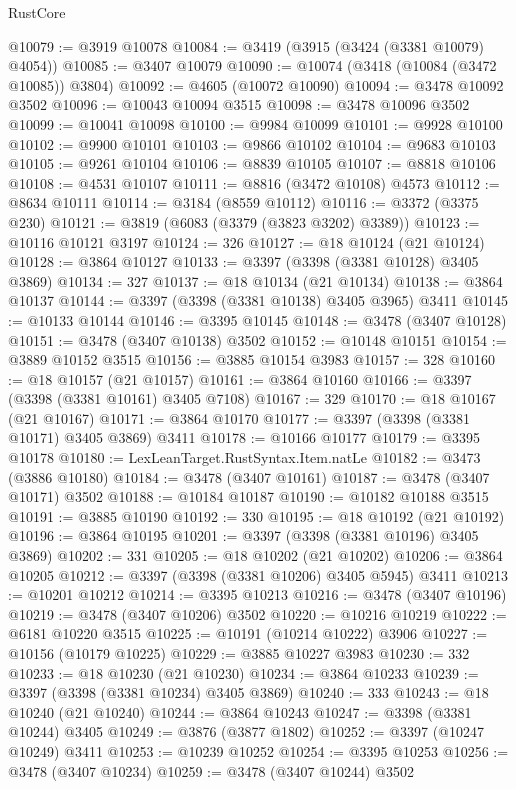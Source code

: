 \begin{lexlean}{RustCore}
\begin{coremodule}
@10079 := @3919 @10078
@10084 := @3419 (@3915 (@3424 (@3381 @10079) @4054))
@10085 := @3407 @10079
@10090 := @10074 (@3418 (@10084 (@3472 @10085)) @3804)
@10092 := @4605 (@10072 @10090)
@10094 := @3478 @10092 @3502
@10096 := @10043 @10094 @3515
@10098 := @3478 @10096 @3502
@10099 := @10041 @10098
@10100 := @9984 @10099
@10101 := @9928 @10100
@10102 := @9900 @10101
@10103 := @9866 @10102
@10104 := @9683 @10103
@10105 := @9261 @10104
@10106 := @8839 @10105
@10107 := @8818 @10106
@10108 := @4531 @10107
@10111 := @8816 (@3472 @10108) @4573
@10112 := @8634 @10111
@10114 := @3184 (@8559 @10112)
@10116 := @3372 (@3375 @230)
@10121 := @3819 (@6083 (@3379 (@3823 @3202) @3389))
@10123 := @10116 @10121 @3197
@10124 := 326
@10127 := @18 @10124 (@21 @10124)
@10128 := @3864 @10127
@10133 := @3397 (@3398 (@3381 @10128) @3405 @3869)
@10134 := 327
@10137 := @18 @10134 (@21 @10134)
@10138 := @3864 @10137
@10144 := @3397 (@3398 (@3381 @10138) @3405 @3965) @3411
@10145 := @10133 @10144
@10146 := @3395 @10145
@10148 := @3478 (@3407 @10128)
@10151 := @3478 (@3407 @10138) @3502
@10152 := @10148 @10151
@10154 := @3889 @10152 @3515
@10156 := @3885 @10154 @3983
@10157 := 328
@10160 := @18 @10157 (@21 @10157)
@10161 := @3864 @10160
@10166 := @3397 (@3398 (@3381 @10161) @3405 @7108)
@10167 := 329
@10170 := @18 @10167 (@21 @10167)
@10171 := @3864 @10170
@10177 := @3397 (@3398 (@3381 @10171) @3405 @3869) @3411
@10178 := @10166 @10177
@10179 := @3395 @10178
@10180 := LexLeanTarget.RustSyntax.Item.natLe
@10182 := @3473 (@3886 @10180)
@10184 := @3478 (@3407 @10161)
@10187 := @3478 (@3407 @10171) @3502
@10188 := @10184 @10187
@10190 := @10182 @10188 @3515
@10191 := @3885 @10190
@10192 := 330
@10195 := @18 @10192 (@21 @10192)
@10196 := @3864 @10195
@10201 := @3397 (@3398 (@3381 @10196) @3405 @3869)
@10202 := 331
@10205 := @18 @10202 (@21 @10202)
@10206 := @3864 @10205
@10212 := @3397 (@3398 (@3381 @10206) @3405 @5945) @3411
@10213 := @10201 @10212
@10214 := @3395 @10213
@10216 := @3478 (@3407 @10196)
@10219 := @3478 (@3407 @10206) @3502
@10220 := @10216 @10219
@10222 := @6181 @10220 @3515
@10225 := @10191 (@10214 @10222) @3906
@10227 := @10156 (@10179 @10225)
@10229 := @3885 @10227 @3983
@10230 := 332
@10233 := @18 @10230 (@21 @10230)
@10234 := @3864 @10233
@10239 := @3397 (@3398 (@3381 @10234) @3405 @3869)
@10240 := 333
@10243 := @18 @10240 (@21 @10240)
@10244 := @3864 @10243
@10247 := @3398 (@3381 @10244) @3405
@10249 := @3876 (@3877 @1802)
@10252 := @3397 (@10247 @10249) @3411
@10253 := @10239 @10252
@10254 := @3395 @10253
@10256 := @3478 (@3407 @10234)
@10259 := @3478 (@3407 @10244) @3502

\end{coremodule}
\end{lexlean}
